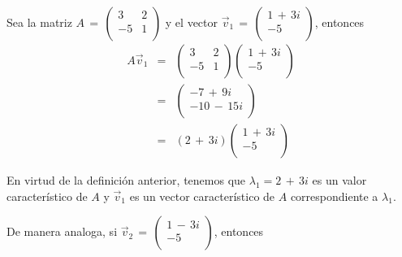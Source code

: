 \documentclass[12pt]{article}
\begin{document}
    Sea la matriz $A \, = \, 
    \begin{pmatrix}
            3 & 2 \\
            -5 & 1 \\
            \end{pmatrix} $ y el vector $\vec{v}_{1} \, = \, \begin{pmatrix}
            1 \, + \, 3i \\
            -5  \\
        \end{pmatrix} $, entonces
    \begin{eqnarray*}
    A \vec{v}_{1} & = & \begin{pmatrix}
            3 & 2 \\
            -5 & 1 \\
            \end{pmatrix} \begin{pmatrix}
            1 \, + \, 3i \\
            -5  \\
            \end{pmatrix} \\[0.2 cm]
    & = & \begin{pmatrix}
            -7 \, + \, 9i \\
            -10 \, - \, 15i\\
            \end{pmatrix} \\[0.2 cm]
    & = & (2 \, + \, 3i) \begin{pmatrix}
            1 \, + \, 3i \\
            -5  \\
            \end{pmatrix}
    \end{eqnarray*}
    
En virtud de la definición anterior, tenemos que $\lambda _{1} = 2 \, + \, 3i $ es un valor característico de $A$ y $\vec{v}_{1}$ es un vector característico de $A$ correspondiente a $\lambda _{1} .$ 

De manera analoga, si $\vec{v}_{2} \, = \, \begin{pmatrix}
            1 \, -\, 3i \\
            -5  \\
            \end{pmatrix} $, entonces 
            
\end{document}
